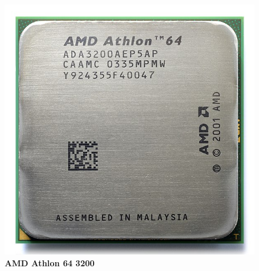 \begin{figure}[htb]
	\centering
	\includegraphics[scale = 0.15]{Graphics/AMD_Athlon_64_3200+_ADA3200AEP5AP.jpg}
	\caption{\textbf{AMD Athlon 64 3200}}
	\label{fig:19}
\end{figure}




